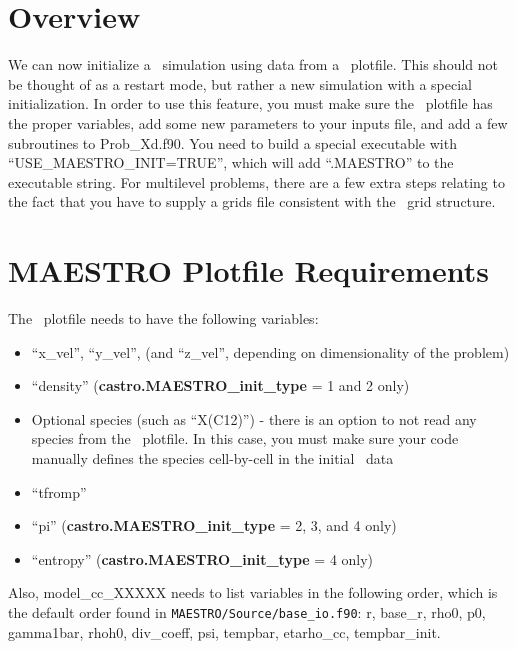 \section{Overview}
We can now initialize a \castro\ simulation using data from a \maestro\
plotfile.  This should not be thought of as a restart mode, but rather
a new simulation with a special initialization.  In order to use this
feature, you must make sure the \maestro\ plotfile has the proper
variables, add some new parameters to your inputs file, and add a few
subroutines to Prob\_Xd.f90.  You need to build a special executable
with ``USE\_MAESTRO\_INIT=TRUE'', which will add ``.MAESTRO'' to the
executable string.  For multilevel problems, there are a few extra
steps relating to the fact that you have to supply a grids file
consistent with the \maestro\ grid structure.

\section{MAESTRO Plotfile Requirements}
The \maestro\ plotfile needs to have the following variables:
\begin{itemize}
\item ``x\_vel'', ``y\_vel'', (and ``z\_vel'', depending on
  dimensionality of the problem)
\item ``density'' ({\bf castro.MAESTRO\_init\_type} = 1 and 2 only)
\item Optional species (such as ``X(C12)'') - there is an option to
  not read any species from the \maestro\ plotfile.  In this case, you
  must make sure your code manually defines the species cell-by-cell
  in the initial \castro\ data
\item ``tfromp''
\item ``pi'' ({\bf castro.MAESTRO\_init\_type} = 2, 3, and 4 only)
\item ``entropy'' ({\bf castro.MAESTRO\_init\_type} = 4 only)
\end{itemize}
Also, model\_cc\_XXXXX needs to list variables in the following order,
which is the default order found in {\tt MAESTRO/Source/base\_io.f90}: r,
base\_r, rho0, p0, gamma1bar, rhoh0, div\_coeff, psi, tempbar,
etarho\_cc, tempbar\_init.

